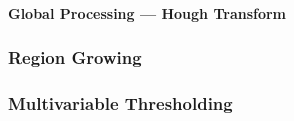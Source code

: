 \documentclass[a4paper,12pt]{article}
\begin{document}
\paragraph{Global Processing --- Hough Transform}


\subsubsection{Region Growing}


\subsubsection{Multivariable Thresholding}

\end{document}
